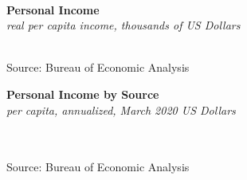 \documentclass{report}
\makeatletter
\newcommand{\tbllink}[1]{\href{https://raw.githubusercontent.com/bdecon/US-chartbook/master/chartbook/data/#1}{\faTable}}
\newcommand*\short[1]{\expandafter\@gobbletwo\number\numexpr#1\relax}
\newcommand{\etsbar}[4]{
		\addplot[ybar stacked, bar width=0.4pt, draw opacity=0, fill=#1] 
			table [x=#2, y=#3, col sep=comma]{#4};}
\newcommand{\shdateaxisticks}{
		date coordinates in=x, axis line style={draw=none},
		xmax={2021-02-01},
		max space between ticks=40,	    
		xtick={{1990-01-01}, {1995-01-01}, {2000-01-01}, 
			{2005-01-01}, {2010-01-01}, {2015-01-01}, {2020-01-01}},
		minor xtick={},
		enlarge y limits={0.06}, enlarge x limits={0.01},
		}
\newcommand{\bbar}[2]{extra #1 ticks = {{#2}}, extra #1 tick labels = ,
		extra #1 tick style = {grid=major, grid style={thick, black!25}},}
\newcommand{\rbars}{
		\fill[color=black!10] (axis cs:{1990-07-01},\pgfkeysvalueof{/pgfplots/ymin}) rectangle 
			(axis cs:{1991-03-01}, \pgfkeysvalueof{/pgfplots/ymax});
		\fill[color=black!10] (axis cs:{2007-12-01},\pgfkeysvalueof{/pgfplots/ymin}) rectangle 
			(axis cs:{2009-07-01}, \pgfkeysvalueof{/pgfplots/ymax});
		\fill[color=black!10] (axis cs:{2001-03-01},\pgfkeysvalueof{/pgfplots/ymin}) rectangle 
			(axis cs:{2001-11-01}, \pgfkeysvalueof{/pgfplots/ymax});}
\makeatother
\begin{document}
{{{\begin{minipage}{0.34\textwidth}
\\
\end{minipage} \hspace{9mm}
\begin{minipage}{0.375\textwidth}
\noindent \normalsize \textbf{Personal Income}\\
\footnotesize{\textit{real per capita income, thousands of US Dollars}}\\
\noindent \hspace*{-3mm} \\
\footnotesize{Source: Bureau of Economic Analysis} \hfill \tbllink{pi_levels.csv}\\
\end{minipage}

\vspace{5mm}

\noindent \normalsize \textbf{Personal Income by Source}\\
\footnotesize{\textit{per capita, annualized, March 2020 US Dollars}}\\ \vspace{4mm}
\noindent \hspace*{-3mm}  \setlength{\tabcolsep}{3.1pt} \color{black!90}
		{\renewcommand{\arraystretch}{1.52}
		 \begin{tabular}{p{37mm} R{11.4mm} R{11.4mm} R{11.4mm} R{11.4mm} R{11.4mm} R{11.4mm}}
			 
			 \hline
		\end{tabular}
		}	\\
		
\vspace{-6mm}
\footnotesize{Source: Bureau of Economic Analysis}

\newpage

\begin{minipage}{0.76\textwidth}


\end{minipage}}}}
\end{document}
